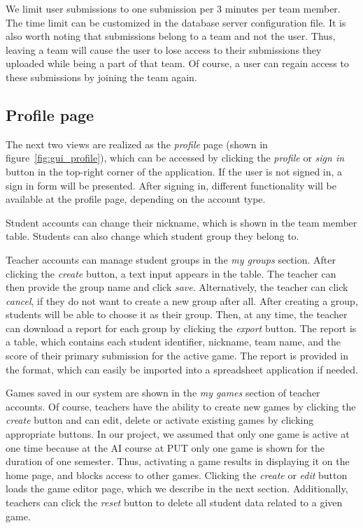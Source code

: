We limit user submissions to one submission per 3 minutes per team member. The time limit can be customized in the database server configuration file. It is also worth noting that submissions belong to a team and not the user. Thus, leaving a team will cause the user to lose access to their submissions they uploaded while being a part of that team. Of course, a user can regain access to these submissions by joining the team again.

\subsection{Profile page}

The next two views are realized as the \emph{profile} page (shown in figure~\ref{fig:gui_profile}), which can be accessed by clicking the \emph{profile} or \emph{sign in} button in the top-right corner of the application. If the user is not signed in, a sign in form will be presented. After signing in, different functionality will be available at the profile page, depending on the account type.

Student accounts can change their nickname, which is shown in the team member table. Students can also change which student group they belong to.

Teacher accounts can manage student groups in the \emph{my groups} section. After clicking the \emph{create} button, a text input appears in the table. The teacher can then provide the group name and click \emph{save}. Alternatively, the teacher can click \emph{cancel}, if they do not want to create a new group after all. After creating a group, students will be able to choose it as their group. Then, at any time, the teacher can download a report for each group by clicking the \emph{export} button. The report is a table, which contains each student identifier, nickname, team name, and the score of their primary submission for the active game. The report is provided in the  format, which can easily be imported into a spreadsheet application if needed.

Games saved in our system are shown in the \emph{my games} section of teacher accounts. Of course, teachers have the ability to create new games by clicking the \emph{create} button and can edit, delete or activate existing games by clicking appropriate buttons. In our project, we assumed that only one game is active at one time because at the AI course at PUT only one game is shown for the duration of one semester. Thus, activating a game results in displaying it on the home page, and blocks access to other games. Clicking the \emph{create} or \emph{edit} button loads the game editor page, which we describe in the next section. Additionally, teachers can click the \emph{reset} button to delete all student data related to a given game.

